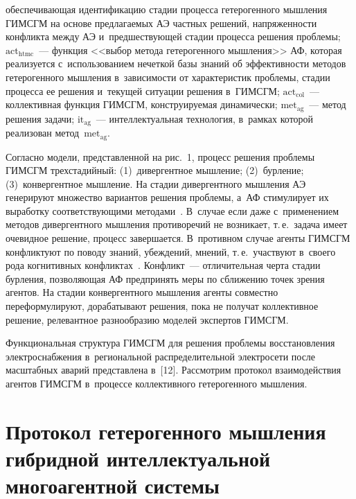 \begin{multicols}{2}
 обеспечивающая идентификацию 
стадии процесса гетерогенного мышления \mbox{ГИМСГМ} на основе предлагаемых 
АЭ частных решений, на\-пря\-жен\-ности конфликта между АЭ и~предшествующей\linebreak 
стадии процесса решения проблемы; $\mathrm{act}_{\mathrm{htmc}}$~--- 
функция <<выбор метода 
гетерогенного мышления>> АФ, которая реализуется с~использованием 
нечеткой базы знаний об эффективности методов гетерогенного мышления 
в~зависимости от характеристик проб\-ле\-мы, стадии процесса ее решения 
и~текущей ситуации решения в~\mbox{ГИМСГМ}; $\mathrm{act}_{\mathrm{col}}$~--- 
коллективная 
функция \mbox{ГИМСГМ}, конструируемая динамически; 
$\mathrm{met}_{\mathrm{ag}}$~--- метод 
решения задачи; $\mathrm{it}_{\mathrm{ag}}$~--- 
интеллектуальная технология, в~рамках которой\linebreak 
реализован метод~$\mathrm{met}_{\mathrm{ag}}$.


  Согласно модели, пред\-став\-лен\-ной на рис.~1, процесс решения проб\-ле\-мы 
\mbox{ГИМСГМ} трехстадийный: (1)~дивергентное мышление; (2)~бурление; 
(3)~конвергентное мышление. На стадии дивергентного мышления  
АЭ генерируют множество вариантов решения проблемы, 
а~АФ стимулирует их выработку соответствующими 
методами~\cite{11-kol}. В~случае если даже с~применением методов дивергентного 
мышления противоречий не возникает, т.\,е.\ задача имеет очевидное решение, 
процесс завершается. В~противном случае агенты ГИМСГМ конфликтуют по 
поводу знаний, убеждений, мнений, т.\,е.\ участвуют в~своего рода когнитивных 
конфликтах~\cite{11-kol, 12-kol}. Конфликт~--- отличительная черта стадии бурления, 
позволяющая АФ предпринять меры по сближению 
точек зрения агентов. На стадии конвергентного мыш\-ле\-ния агенты совместно 
переформулируют, дорабатывают решения, пока не получат коллективное 
решение, релевантное разнообразию моделей экспертов \mbox{ГИМСГМ}. 
  
  Функциональная структура ГИМСГМ для решения проблемы 
восстановления электроснабжения в~региональной распределительной 
электросети после масштабных аварий представлена в~[12]. Рассмотрим 
протокол взаимодействия агентов ГИМСГМ в~процессе коллективного 
гетерогенного мышления.
  
\section{Протокол гетерогенного мышления гибридной 
интеллектуальной многоагентной системы}
 

\end{multicols}
